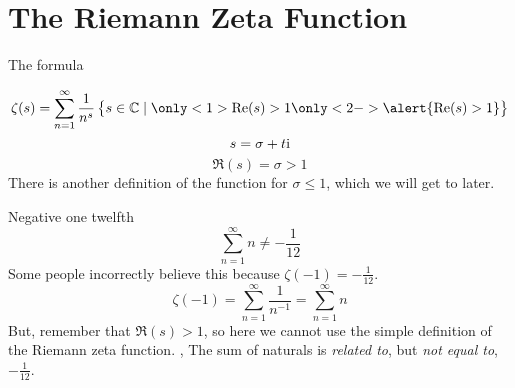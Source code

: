 \section{The Riemann Zeta Function}
\begin{namedframe}{The formula}
	\begin{definition}
		\[\zeta(s) = \sum_{n=1}^\infty \frac{1}{n^s} \set{s \in \complex \such \only<1>{\Re(s) > 1} \only<2->{\alert{\Re(s) > 1}}}\]
		\[s = \sigma + t\mathrm{i}\]
		\pause
		\[\Re(s) = \sigma > 1\]
		\pause
		There is another definition of the function for $\sigma \leq 1$, which we will get to later.
	\end{definition}
\end{namedframe}
\begin{namedframe}{Negative one twelfth}
	\[\sum_{n=1}^\infty n \neq -\frac{1}{12}\]
	\pause
	Some people incorrectly believe this because $\zeta(-1) = -\frac{1}{12}$.
	\[\zeta(-1) = \sum_{n=1}^\infty \frac{1}{n^{-1}} = \sum_{n=1}^\infty n\]
	\pause
	But, remember that $\Re(s) > 1$, so here we cannot use the simple definition of the Riemann zeta function.
	\sep
	\alert{The sum of naturals is \emph{related to}, but \emph{not equal to}, $-\frac{1}{12}$.}
\end{namedframe}

